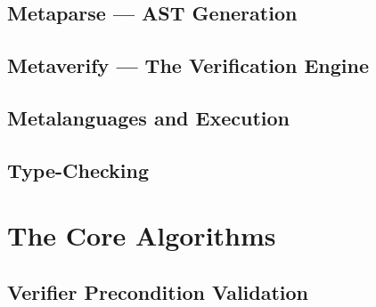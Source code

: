 
\subsection{Metaparse --- AST Generation} %
\label{sub:metaparse_ast_generation}


\subsection{Metaverify --- The Verification Engine} %
\label{sub:metaverify_the_verification_engine}


\subsection{Metalanguages and Execution} %
\label{sub:metalanguages_and_execution}


\subsection{Type-Checking} %
\label{sub:type_checking}



\section{The Core Algorithms} %
\label{sec:the_core_algorithms}

\subsection{Verifier Precondition Validation} %
\label{sub:verifier_precondition_validation}

